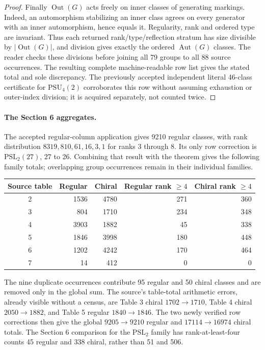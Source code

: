 \documentclass[10pt]{article}
\newcommand{\Aut}{\operatorname{Aut}}\newcommand{\Out}{\operatorname{Out}}
\begin{document}
\begin{proof}
Finally $\Out(G)$ acts freely on inner classes of generating markings.
Indeed, an automorphism stabilizing an inner class agrees on every
generator with an inner automorphism, hence equals it. Regularity, rank
and ordered type are invariant. Thus each returned rank/type/reflection
stratum has size divisible by $|\Out(G)|$, and division gives exactly the
ordered $\Aut(G)$ classes. The reader checks these divisions before
joining all 79 groups to all 88 source occurrences. The resulting complete
machine-readable row list gives the stated total and sole discrepancy.
The previously accepted independent literal 46-class certificate for
$\mathrm{PSU}_4(2)$ corroborates this row without assuming exhaustion or
outer-index division; it is acquired separately, not counted twice.
\end{proof}

\paragraph{The Section 6 aggregates.}
The accepted regular-column application gives 9210 regular classes, with
rank distribution $8319,810,61,16,3,1$ for ranks 3 through 8. Its only row
correction is $\mathrm{PSL}_2(27)$, 27 to 26. Combining that result with
the theorem gives the following family totals; overlapping group
occurrences remain in their individual families.
\begin{center}
\begin{tabular}{crrrr}\toprule
Source table&Regular&Chiral&Regular rank $\geq4$&Chiral rank $\geq4$\\\midrule
2&1536&4780&271&360\\
3&804&1710&234&348\\
4&3903&1882&45&338\\
5&1846&3998&180&448\\
6&1202&4242&170&464\\
7&14&412&0&0\\\bottomrule
\end{tabular}
\end{center}
The nine duplicate occurrences contribute 95 regular and 50 chiral
classes and are removed only in the global sum. The source's table-total
arithmetic errors, already visible without a census, are Table 3 chiral
$1702\to1710$, Table 4 chiral $2050\to1882$, and Table 5 regular
$1840\to1846$. The two newly verified row corrections then give the
global $9205\to9210$ regular and $17114\to16974$ chiral totals.
The Section 6 comparison for the $\mathrm{PSL}_2$ family has rank-at-least-four
counts 45 regular and 338 chiral, rather than 51 and 506.
\end{document}
